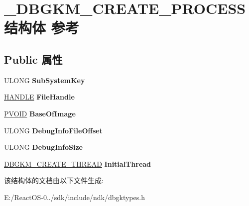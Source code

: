\hypertarget{struct___d_b_g_k_m___c_r_e_a_t_e___p_r_o_c_e_s_s}{}\section{\+\_\+\+D\+B\+G\+K\+M\+\_\+\+C\+R\+E\+A\+T\+E\+\_\+\+P\+R\+O\+C\+E\+S\+S结构体 参考}
\label{struct___d_b_g_k_m___c_r_e_a_t_e___p_r_o_c_e_s_s}
\subsection*{Public 属性}
\begin{DoxyCompactItemize}
\item 
\mbox{\label{struct___d_b_g_k_m___c_r_e_a_t_e___p_r_o_c_e_s_s_af2a6fe5626ff8e054bb6766f3d204c94}} 
U\+L\+O\+NG {\bfseries Sub\+System\+Key}
\item 
\mbox{\label{struct___d_b_g_k_m___c_r_e_a_t_e___p_r_o_c_e_s_s_ad048e8b02cce2a0acd4c90bc9546ba46}} 
\hyperlink{interfacevoid}{H\+A\+N\+D\+LE} {\bfseries File\+Handle}
\item 
\mbox{\label{struct___d_b_g_k_m___c_r_e_a_t_e___p_r_o_c_e_s_s_a10228b71255bdc2ca5c937e7219b2a59}} 
\hyperlink{interfacevoid}{P\+V\+O\+ID} {\bfseries Base\+Of\+Image}
\item 
\mbox{\label{struct___d_b_g_k_m___c_r_e_a_t_e___p_r_o_c_e_s_s_aceac13e907343aa97df6f58a2791a6bb}} 
U\+L\+O\+NG {\bfseries Debug\+Info\+File\+Offset}
\item 
\mbox{\label{struct___d_b_g_k_m___c_r_e_a_t_e___p_r_o_c_e_s_s_a8c61635ac6e4ba463105b56825dcb31d}} 
U\+L\+O\+NG {\bfseries Debug\+Info\+Size}
\item 
\mbox{\label{struct___d_b_g_k_m___c_r_e_a_t_e___p_r_o_c_e_s_s_a9a25c08b16f33cab1a1800192a9af037}} 
\hyperlink{struct___d_b_g_k_m___c_r_e_a_t_e___t_h_r_e_a_d}{D\+B\+G\+K\+M\+\_\+\+C\+R\+E\+A\+T\+E\+\_\+\+T\+H\+R\+E\+AD} {\bfseries Initial\+Thread}
\end{DoxyCompactItemize}


该结构体的文档由以下文件生成\+:\begin{DoxyCompactItemize}
\item 
E\+:/\+React\+O\+S-\/0../sdk/include/ndk/dbgktypes.\+h\end{DoxyCompactItemize}

